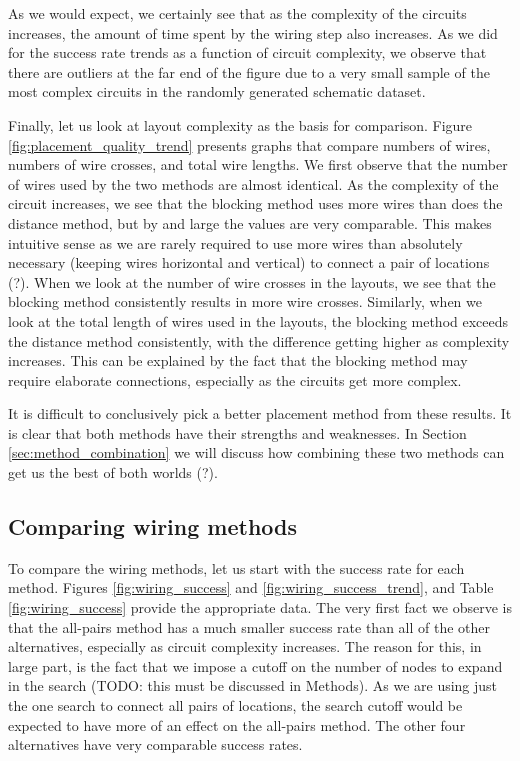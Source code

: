 As we would expect, we certainly see that as the complexity of the circuits
increases, the amount of time spent by the wiring step also increases. As we did
for the success rate trends as a function of circuit complexity, we observe that
there are outliers at the far end of the figure due to a very small sample of the
most complex circuits in the randomly generated schematic dataset.

Finally, let us look at layout complexity as the basis for comparison. Figure
\ref{fig:placement_quality_trend} presents graphs that compare numbers of wires,
numbers of wire crosses, and total wire lengths. We first observe that the
number of wires used by the two methods are almost identical. As the complexity
of the circuit increases, we see that the blocking method uses more wires than
does the distance method, but by and large the values are very comparable. This
makes intuitive sense as we are rarely required to use more wires than
absolutely necessary (keeping wires horizontal and vertical) to connect a pair
of locations (?). When we look at the number of wire crosses in the layouts, we
see that the blocking method consistently results in more wire crosses. Similarly,
when we look at the total length of wires used in the layouts, the blocking
method exceeds the distance method consistently, with the difference getting
higher as complexity increases. This can be explained by the fact that the
blocking method may require elaborate connections, especially as the circuits
get more complex.

It is difficult to conclusively pick a better placement method from these results.
It is clear that both methods have their strengths and weaknesses. In Section
\ref{sec:method_combination} we will discuss how combining these two methods can
get us the best of both worlds (?).

\subsection{Comparing wiring methods}

To compare the wiring methods, let us start with the success rate for each method.
Figures \ref{fig:wiring_success} and \ref{fig:wiring_success_trend}, and Table
\ref{fig:wiring_success} provide the appropriate data. The very first fact we
observe is that the all-pairs method has a much smaller success rate than all of
the other alternatives, especially as circuit complexity increases. The reason
for this, in large part, is the fact that we impose a cutoff on the number of
nodes to expand in the search (TODO: this must be discussed in Methods). As we
are using just the one search to connect all pairs of locations, the search
cutoff would be expected to have more of an effect on the all-pairs method. The
other four alternatives have very comparable success rates.

